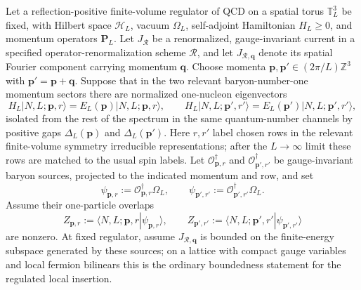 \begin{proposition}
\label{prop:qcd-stable-current-three-point-extraction}
Let a reflection-positive finite-volume regulator of QCD on a spatial torus
\(\mathbb T_L^3\) be fixed, with Hilbert space \(\mathcal H_L\), vacuum
\(\Omega_L\), self-adjoint Hamiltonian \(H_L\ge0\), and momentum operators
\(\mathbf P_L\).  Let \(J_{\mathcal R}\) be a renormalized, gauge-invariant
current in a specified operator-renormalization scheme \(\mathcal R\), and let
\(J_{\mathcal R,\mathbf q}\) denote its spatial Fourier component carrying
momentum \(\mathbf q\).  Choose momenta
\(\mathbf p,\mathbf p'\in(2\pi/L)\mathbb Z^3\) with
\(\mathbf p'=\mathbf p+\mathbf q\).  Suppose that in the two relevant
baryon-number-one momentum sectors there are normalized one-nucleon eigenvectors
\[
  H_L|N,L;\mathbf p,r\rangle=E_L(\mathbf p)|N,L;\mathbf p,r\rangle,\qquad
  H_L|N,L;\mathbf p',r'\rangle=E_L(\mathbf p')|N,L;\mathbf p',r'\rangle,
\]
isolated from the rest of the spectrum in the same quantum-number channels by
positive gaps \(\Delta_L(\mathbf p)\) and \(\Delta_L(\mathbf p')\).  Here
\(r,r'\) label chosen rows in the relevant finite-volume symmetry irreducible
representations; after the \(L\to\infty\) limit these rows are matched to the
usual spin labels.  Let \(\mathcal O_{\mathbf p,r}^\dagger\) and
\(\mathcal O_{\mathbf p',r'}^\dagger\) be gauge-invariant baryon sources,
projected to the indicated momentum and row, and set
\[
  \psi_{\mathbf p,r}:=\mathcal O_{\mathbf p,r}^\dagger\Omega_L,\qquad
  \psi_{\mathbf p',r'}:=\mathcal O_{\mathbf p',r'}^\dagger\Omega_L.
\]
Assume their one-particle overlaps
\[
  Z_{\mathbf p,r}:=\langle N,L;\mathbf p,r|\psi_{\mathbf p,r}\rangle,\qquad
  Z_{\mathbf p',r'}:=
  \langle N,L;\mathbf p',r'|\psi_{\mathbf p',r'}\rangle
\]
are nonzero.  At fixed regulator, assume \(J_{\mathcal R,\mathbf q}\) is
bounded on the finite-energy subspace generated by these sources; on a lattice
with compact gauge variables and local fermion bilinears this is the ordinary
boundedness statement for the regulated local insertion.


\end{proposition}

